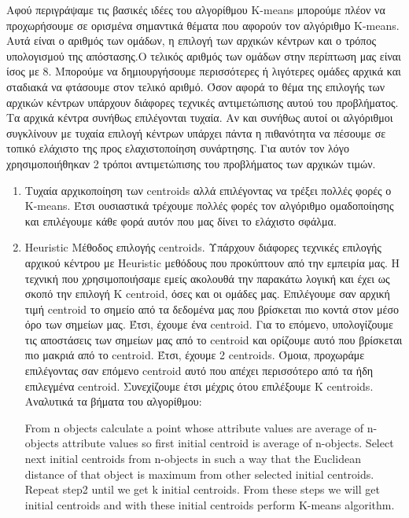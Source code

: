 Αφού περιγράψαμε τις βασικές ιδέες του αλγορίθμου K-means μπορούμε πλέον να προχωρήσουμε σε ορισμένα σημαντικά θέματα που αφορούν τον αλγόριθμο K-means. Αυτά είναι ο αριθμός των ομάδων, η επιλογή των αρχικών κέντρων και ο τρόπος υπολογισμού της απόστασης.Ο τελικός αριθμός των ομάδων στην περίπτωση μας είναι ίσος με 8. Μπορούμε να δημιουργήσουμε περισσότερες ή λιγότερες ομάδες αρχικά και σταδιακά να φτάσουμε στον τελικό αριθμό. Όσον αφορά το θέμα της επιλογής των αρχικών κέντρων υπάρχουν διάφορες τεχνικές αντιμετώπισης αυτού του προβλήματος. Τα αρχικά κέντρα συνήθως επιλέγονται τυχαία. Αν και συνήθως αυτοί οι αλγόριθμοι συγκλίνουν με τυχαία επιλογή κέντρων υπάρχει πάντα η πιθανότητα να πέσουμε σε τοπικό ελάχιστο της προς ελαχιστοποίηση συνάρτησης. Για αυτόν τον λόγο χρησιμοποιήθηκαν 2 τρόποι αντιμετώπισης του προβλήματος των αρχικών τιμών.
\begin{enumerate}
    \item Τυχαία αρχικοποίηση των centroids αλλά επιλέγοντας να τρέξει πολλές φορές ο K-means. Έτσι ουσιαστικά τρέχουμε πολλές φορές τον αλγόριθμο ομαδοποίησης και επιλέγουμε κάθε φορά αυτόν που μας δίνει το ελάχιστο σφάλμα.

    \item Heuristic Μέθοδος επιλογής centroids.
    Υπάρχουν διάφορες τεχνικές επιλογής αρχικού κέντρου με Heuristic μεθόδους που προκύπτουν από την εμπειρία μας.
    Η τεχνική που χρησιμοποιήσαμε εμείς ακολουθά την παρακάτω λογική και έχει ως σκοπό την επιλογή Κ centroid, όσες και οι ομάδες μας.
    Επιλέγουμε σαν αρχική τιμή centroid το σημείο από τα δεδομένα μας που βρίσκεται πιο κοντά στον μέσο όρο των σημείων μας.
    Έτσι, έχουμε ένα centroid.
    Για το επόμενο, υπολογίζουμε τις αποστάσεις των σημείων μας από το centroid και ορίζουμε αυτό που βρίσκεται πιο μακριά από το centroid.
    Έτσι, έχουμε 2 centroids.
    Όμοια, προχωράμε επιλέγοντας σαν επόμενο centroid αυτό που απέχει περισσότερο από τα ήδη επιλεγμένα centroid.
    Συνεχίζουμε έτσι μέχρις ότου επιλέξουμε K centroids.
    Αναλυτικά τα βήματα του αλγορίθμου:\\
    \noindent\begin{minipage}{0.9\linewidth}
    \centering
    \begin{algorithm}[H]
        From n objects calculate a point whose attribute values are average of n-objects attribute values so first initial centroid is average of n-objects.\;
        Select next initial centroids from n-objects in such a way that the Euclidean distance of that object is maximum from other selected initial centroids.\;
        Repeat step2 until we get k initial centroids.
        From these steps we will get initial centroids and with these initial centroids perform K-means algorithm.\;
    \end{algorithm}
    \end{minipage}
\end{enumerate}

